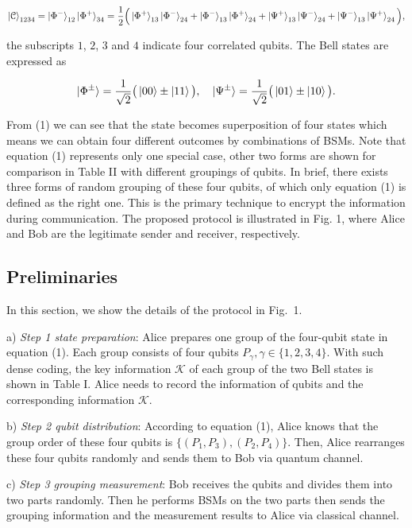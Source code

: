 \documentclass[a4paper,11pt]{article}
\begin{document}
\begin{equation*}
\ket{\mathcal{C}}_{1234} = \ket{\Phi^-}_{12} \ket{\Phi^+}_{34}
= \dfrac{1}{2} \Big(\ket{\Phi^+}_{13} \ket{\Phi^-}_{24} + 
 					\ket{\Phi^-}_{13} \ket{\Phi^+}_{24} +
 					\ket{\Psi^+}_{13} \ket{\Psi^-}_{24} +
 					\ket{\Psi^-}_{13} \ket{\Psi^+}_{24} \Big),
\end{equation*}

the subscripts $1$, $2$, $3$ and $4$ indicate four correlated qubits. The Bell states are expressed as

\begin{equation*}
\ket{\Phi^{\pm}} = \dfrac{1}{\sqrt2}\big(\ket{00} \pm \ket{11} \big), \quad
\ket{\Psi^{\pm}} = \dfrac{1}{\sqrt2}\big(\ket{01} \pm \ket{10} \big).
\end{equation*}

From (1) we can see that the state becomes superposition of four states which means we can obtain four different outcomes by combinations of BSMs. Note that equation (1) represents only one special case, other two forms are shown
for comparison in Table II with different groupings of qubits. In brief, there exists three forms of random grouping of these four qubits, of which only equation (1) is defined as the right one. This is the primary technique to encrypt the information during communication. The proposed protocol is illustrated in Fig. 1, where Alice and Bob are the legitimate sender and
receiver, respectively.

\subsection{Preliminaries}
In this section, we show the details of the protocol in Fig.~1.

a) \textit{Step 1 state preparation}: Alice prepares one group of the four-qubit state in equation (1). Each group consists of four qubits $P_\gamma, \gamma \in \{1,2,3,4\}$. With such dense coding, the key information $\mathcal{K}$ of each group of the two Bell states is shown in Table I. Alice needs to record the information of qubits and the corresponding information $\mathcal{K}$.

b) \textit{Step 2 qubit distribution}: According to equation (1), Alice knows that the group order of these four qubits is $\{(P_1, P_3), (P_2, P_4)\}$. Then, Alice rearranges these four qubits randomly and sends them to Bob via quantum channel.

c) \textit{Step 3 grouping measurement}: Bob receives the qubits and divides them into two parts randomly. Then he performs BSMs on the two parts then sends the grouping information and the measurement results to Alice via classical channel.
\end{document}
